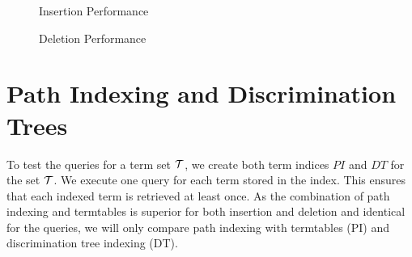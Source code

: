 \begin{figure}[h]
  \begin{minipage}{0.45\textwidth}
\begin{adjustbox}{width=1\textwidth}
\end{adjustbox}
\caption{Insertion Performance}
\label{pi_insert}
\end{minipage}
\begin{minipage}{0.1\textwidth}
\end{minipage}
\begin{minipage}{0.45\textwidth}
\begin{adjustbox}{width=1\textwidth}
\end{adjustbox}
\caption{Deletion Performance}
\label{pi_delete}
\end{minipage}
\end{figure}

\section{Path Indexing and Discrimination Trees} \label{pi_dt}
To test the queries for a term set $\mathcal{T}$, we create both term indices $PI$ and $DT$ for the set $\mathcal{T}$. We execute one query for each term stored in the index. This ensures that each indexed term is retrieved at least once. As the combination of path indexing and termtables is superior for both insertion and deletion and identical for the queries, we will only compare path indexing with termtables (PI) and discrimination tree indexing (DT).

